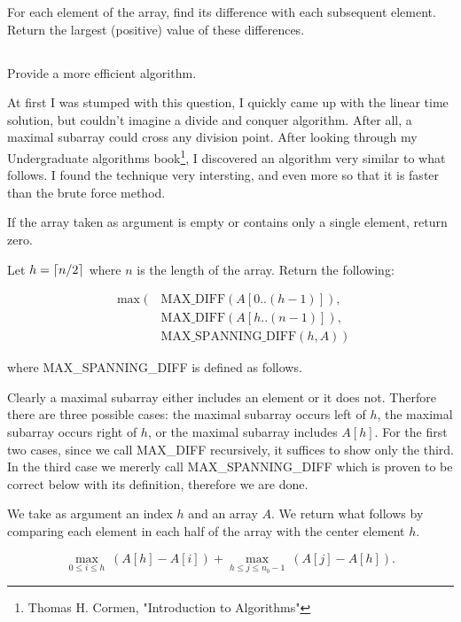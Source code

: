 \documentclass{amsart}
\theoremstyle{definition}
\theoremstyle{remark}
\numberwithin{equation}{section}
\DeclarePairedDelimiter{\ceil}{\lceil}{\rceil}
\begin{document}
For each element of the array, find its difference with each subsequent
element. Return the largest (positive) value of these differences.

\subsection{} Provide a more efficient algorithm.

At first I was stumped with this question, I quickly came up with
the linear time solution, but couldn't imagine a divide and conquer
algorithm. After all, a maximal subarray could cross any division point.
After looking through my Undergraduate algorithms book\footnote{Thomas
H. Cormen, "Introduction to Algorithms"}, I discovered an algorithm very similar
to what follows. I found the technique very intersting, and even more so that 
it is faster than the brute force method.


If the array taken as argument is empty or contains only a single element, return zero.

Let $h = \ceil{n/2}$ where $n$ is the length of the array. Return the following:

\begin{align*}
  \max(\ & \text{MAX\_DIFF}( A[0..(h-1)] ), \\
        & \text{MAX\_DIFF}( A[h..(n-1)] ), \\
        & \text{MAX\_SPANNING\_DIFF}( h, A)\ )
\end{align*}

where MAX\_SPANNING\_DIFF is defined as follows.

\proof 

Clearly a maximal subarray either includes an element or it does not.
Therfore there are three possible cases: the maximal subarray occurs
left of $h$, the maximal subarray occurs right of $h$, or the maximal
subarray includes $A[h]$. For the first two cases, since we call
MAX\_DIFF recursively, it suffices to show only the third. In the third
case we mererly call MAX\_SPANNING\_DIFF which is proven to be correct
below with its definition, therefore we are done.


We take as argument an index $h$ and an array $A$. We return what
follows by comparing each element in each half of the array with the
center element $h$.

$$ \max_{0 \leq i \leq h}\ (A[h] - A[i]) + \max_{h \leq j \leq n_b -1}\ (A[j] - A[h]). $$
\end{document}
